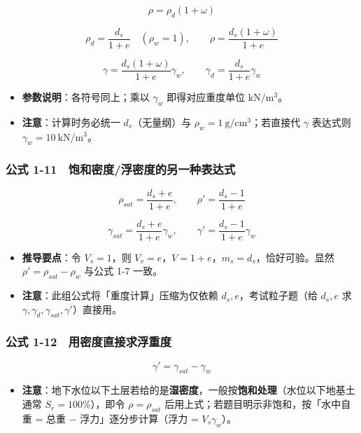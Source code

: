 \documentclass[
]{article}
\providecommand{\tightlist}{%
  \setlength{\itemsep}{0pt}\setlength{\parskip}{0pt}}
\begin{document}
\[\rho=\rho_d(1+\omega)\]

\[\rho_d=\frac{d_s}{1+e}\quad(\rho_w=1),\qquad \rho=\frac{d_s(1+\omega)}{1+e}\]

\[\gamma=\frac{d_s(1+\omega)}{1+e}\gamma_w,\qquad \gamma_d=\frac{d_s}{1+e}\gamma_w\]

\begin{itemize}
\tightlist
\item
  \textbf{参数说明}：各符号同上；乘以 \(\gamma_w\) 即得对应重度单位
  \(\mathrm{kN/m^3}\)。
\item
  \textbf{注意}：计算时务必统一 \(d_s\)（无量纲）与
  \(\rho_w=1\ \mathrm{g/cm^3}\)；若直接代 \(\gamma\) 表达式则
  \(\gamma_w=10\ \mathrm{kN/m^3}\)。
\end{itemize}

\subsubsection{公式
1-11　饱和密度/浮密度的另一种表达式}\label{ux516cux5f0f-1-11-ux9971ux548cux5bc6ux5ea6ux6d6eux5bc6ux5ea6ux7684ux53e6ux4e00ux79cdux8868ux8fbeux5f0f}

\[\rho_{sat}=\frac{d_s+e}{1+e},\qquad \rho'=\frac{d_s-1}{1+e}\]

\[\gamma_{sat}=\frac{d_s+e}{1+e}\gamma_w,\qquad \gamma'=\frac{d_s-1}{1+e}\gamma_w\]

\begin{itemize}
\tightlist
\item
  \textbf{推导要点}：令 \(V_s=1\)，则
  \(V_v=e\)，\(V=1+e\)，\(m_s=d_s\)，恰好可验。显然
  \(\rho'=\rho_{sat}-\rho_w\) 与公式 1-7 一致。
\item
  \textbf{注意}：此组公式将「重度计算」压缩为仅依赖
  \(d_s,e\)，考试粒子题（给 \(d_s,e\) 求
  \(\gamma,\gamma_d,\gamma_{sat},\gamma'\)）直接用。
\end{itemize}

\subsubsection{公式
1-12　用密度直接求浮重度}\label{ux516cux5f0f-1-12-ux7528ux5bc6ux5ea6ux76f4ux63a5ux6c42ux6d6eux91cdux5ea6}

\[\gamma'=\gamma_{sat}-\gamma_w\]

\begin{itemize}
\tightlist
\item
  \textbf{注意}：地下水位以下土层若给的是\textbf{湿密度}，一般按\textbf{饱和处理}（水位以下地基土通常
  \(S_r=100\%\)），即令 \(\rho=\rho_{sat}\)
  后用上式；若题目明示非饱和，按「水中自重 = 总重 −
  浮力」逐分步计算（浮力 = \(V_s\gamma_w\)）。
\end{itemize}
\end{document}
